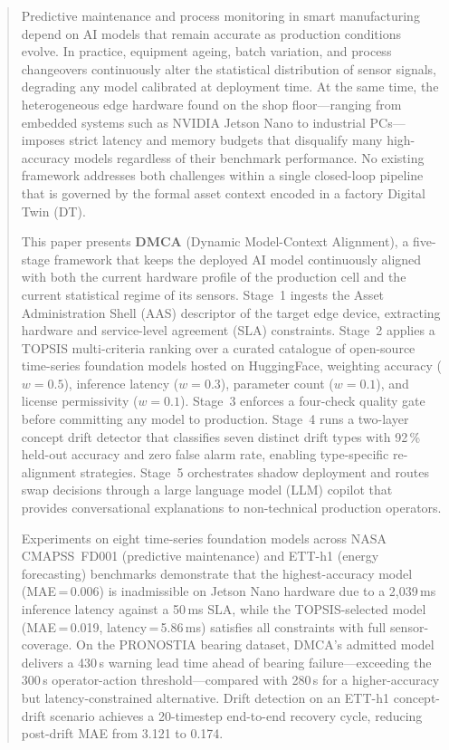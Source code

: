 \documentclass[12pt,a4paper]{article}
\begin{document}
\begin{abstract}
Predictive maintenance and process monitoring in smart manufacturing
depend on AI models that remain accurate as production conditions
evolve.
In practice, equipment ageing, batch variation, and process changeovers
continuously alter the statistical distribution of sensor signals,
degrading any model calibrated at deployment time.
At the same time, the heterogeneous edge hardware found on the shop
floor---ranging from embedded systems such as NVIDIA Jetson Nano to
industrial PCs---imposes strict latency and memory budgets that
disqualify many high-accuracy models regardless of their benchmark
performance.
No existing framework addresses both challenges within a single
closed-loop pipeline that is governed by the formal asset context
encoded in a factory Digital Twin (DT).

This paper presents \textbf{DMCA} (Dynamic Model-Context Alignment), a
five-stage framework that keeps the deployed AI model continuously
aligned with both the current hardware profile of the production cell
and the current statistical regime of its sensors.
Stage~1 ingests the Asset Administration Shell (AAS) descriptor of
the target edge device, extracting hardware and service-level agreement
(SLA) constraints.
Stage~2 applies a TOPSIS multi-criteria ranking over a curated catalogue
of open-source time-series foundation models hosted on HuggingFace,
weighting accuracy ($w=0.5$), inference latency ($w=0.3$), parameter
count ($w=0.1$), and license permissivity ($w=0.1$).
Stage~3 enforces a four-check quality gate before committing any model
to production.
Stage~4 runs a two-layer concept drift detector that classifies seven
distinct drift types with 92\,\% held-out accuracy and zero false alarm
rate, enabling type-specific re-alignment strategies.
Stage~5 orchestrates shadow deployment and routes swap decisions through
a large language model (LLM) copilot that provides conversational
explanations to non-technical production operators.

Experiments on eight time-series foundation models across NASA
CMAPSS~FD001 (predictive maintenance) and ETT-h1 (energy forecasting)
benchmarks demonstrate that the highest-accuracy model (MAE\,=\,0.006)
is inadmissible on Jetson Nano hardware due to a 2{,}039\,ms inference
latency against a 50\,ms SLA, while the TOPSIS-selected model
(MAE\,=\,0.019, latency\,=\,5.86\,ms) satisfies all constraints with
full sensor-coverage.
On the PRONOSTIA bearing dataset, DMCA's admitted model delivers a
430\,s warning lead time ahead of bearing failure---exceeding the
300\,s operator-action threshold---compared with 280\,s for a
higher-accuracy but latency-constrained alternative.
Drift detection on an ETT-h1 concept-drift scenario achieves a
20-timestep end-to-end recovery cycle, reducing post-drift MAE from
3.121 to 0.174.
\end{abstract}
\end{document}
